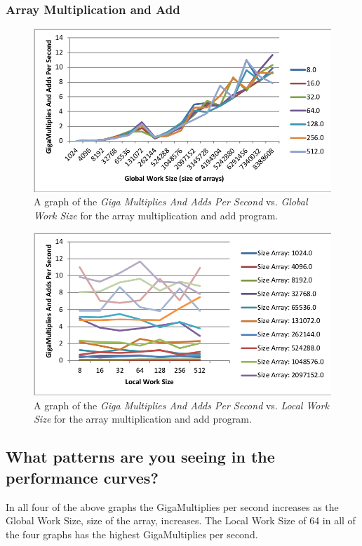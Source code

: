 \documentclass[onecolumn,draftclsnofoot, 10pt, compsoc]{IEEEtran}
\begin{document}
		\subsubsection{Array Multiplication and Add}
			\begin{figure}[H]
				\includegraphics[width=16cm]{addGlobal}
				\centering
				\caption{A graph of the \textit{Giga Multiplies And Adds Per Second} vs. \textit{Global Work Size} for the array multiplication and add program.}
			\end{figure}
			
			\begin{figure}[H]
				\includegraphics[width=16cm]{addLocal}
				\centering
				\caption{A graph of the \textit{Giga Multiplies And Adds Per Second} vs. \textit{Local Work Size} for the array multiplication and add program.}
			\end{figure}

			
	









	\subsection{What patterns are you seeing in the performance curves?}
		In all four of the above graphs the GigaMultiplies per second increases as the Global Work Size, size of the array, increases. 
		The Local Work Size of 64 in all of the four graphs has the highest GigaMultiplies per second.
	
\end{document}
